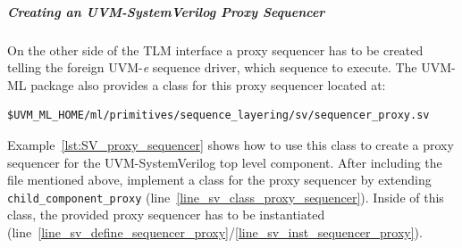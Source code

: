 \subparagraph{Creating an UVM-SystemVerilog Proxy Sequencer}
On the other side of the TLM interface a proxy sequencer has to be created telling the foreign UVM-\textit{e} sequence driver, which sequence to execute. The UVM-ML package also provides a class for this proxy sequencer located at:
\smallskip
{}
\begin{lstlisting}
$UVM_ML_HOME/ml/primitives/sequence_layering/sv/sequencer_proxy.sv
\end{lstlisting} 
\smallskip
Example~\ref{lst:SV_proxy_sequencer} shows how to use this class to create a proxy sequencer for the UVM-SystemVerilog top level component. After including the file mentioned above, implement a class for the proxy sequencer by extending \lstinline$child_component_proxy$ (line~\ref{line_sv_class_proxy_sequencer}). Inside of this class, the provided proxy sequencer has to be instantiated (line~\ref{line_sv_define_sequencer_proxy}/\ref{line_sv_inst_sequencer_proxy}).\\

